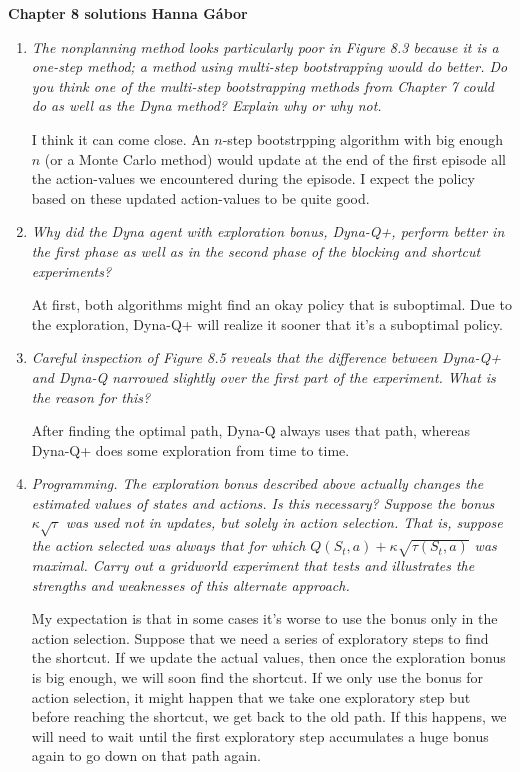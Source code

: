 \documentclass[12pt,a4paper]{article}
\begin{document}
\textbf{Chapter 8 solutions  \hfill Hanna Gábor}

\begin{enumerate}
  \item
    \textit{The nonplanning method looks particularly poor in Figure 8.3 because it is
    a one-step method; a method using multi-step bootstrapping would do better. Do you
    think one of the multi-step bootstrapping methods from Chapter 7 could do as well as
    the Dyna method? Explain why or why not.}

    I think it can come close. An $n$-step bootstrpping algorithm with big enough $n$ (or a
    Monte Carlo method) would update at the end of the first episode all the action-values we
    encountered during the episode.
    I expect the policy based on these updated action-values to be quite good.

  \item
    \textit{Why did the Dyna agent with exploration bonus, Dyna-Q+, perform
    better in the first phase as well as in the second phase of the blocking and shortcut
    experiments?}

    At first, both algorithms might find an okay policy that is suboptimal. Due
    to the exploration, Dyna-Q+ will realize it sooner that it's a suboptimal policy.

  \item
    \textit{Careful inspection of Figure 8.5 reveals that the difference between Dyna-Q+
    and Dyna-Q narrowed slightly over the first part of the experiment. What is the reason
    for this?}

    After finding the optimal path, Dyna-Q always uses that path, whereas Dyna-Q+
    does some exploration from time to time.

  \item
    \textit{Programming. The exploration bonus described above actually changes
    the estimated values of states and actions. Is this necessary? Suppose the bonus
    $\kappa \sqrt{\tau}$ was used not in updates, but solely in action selection.
    That is, suppose the action selected was always that for which $Q(S_t, a) +
    \kappa \sqrt{\tau (S_t, a)}$ was maximal. Carry out a gridworld experiment
    that tests and illustrates the strengths and weaknesses of this alternate approach.}

    My expectation is that in some cases it's worse to use the bonus only in the
    action selection. Suppose that we need a series of exploratory steps to find
    the shortcut. If we update the actual values, then once the exploration bonus
    is big enough, we will soon find the shortcut. If we only use the bonus for action
    selection, it might happen that we take one exploratory step but before reaching the
    shortcut, we get back to the old path. If this happens, we will need to wait until
    the first exploratory step accumulates a huge bonus again to go down on that
    path again.


\end{enumerate}
\end{document}
